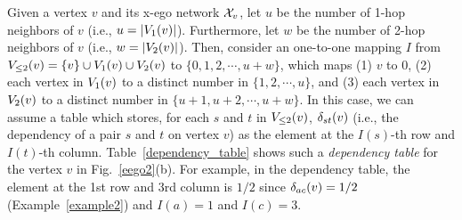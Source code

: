
Given a vertex $v$ and its x-ego network $\XN{v}$, let $u$ be the number of 1-hop neighbors of $v$ (i.e., $u = |\V{v}{1}|$). 
Furthermore, let $w$ be the number of 2-hop neighbors of $v$ (i.e., $w = |\V{v}{2}|$).
Then, consider an one-to-one mapping $I$ from $\LV{v}{2} = \{v\} \cup \V{v}{1} \cup \V{v}{2}$ to $\{ 0, 1, 2, \cdots, u+w \}$, which maps (1) $v$ to 0, (2) each vertex in $\V{v}{1}$ to a distinct number in $\{1, 2, \cdots, u \}$, and (3) each vertex in $\V{v}{2}$ to a distinct number in $\{ u+1, u+2, \cdots, u+w \}$.
In this case, we can assume a table which stores, for each $s$ and $t$ in $\LV{v}{2}$, $\D{s}{t}{v}$ (i.e., the dependency of a pair $s$ and $t$ on vertex $v$) as the element at the $I(s)$-th row and $I(t)$-th column.
Table~\ref{dependency_table} shows such a {\em dependency table} for the vertex $v$ in Fig.~\ref{eego2}(b).
For example, in the dependency table, the element at the 1st row and 3rd column is $1/2$ since $\D{a}{c}{v} = 1/2$ (Example~\ref{example2}) and $I(a) = 1$ and $I(c) = 3$.

